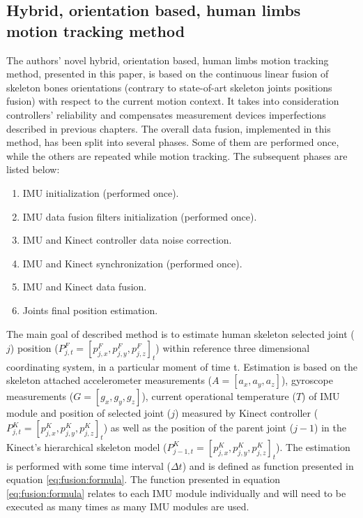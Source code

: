 \documentclass[sensors,article,submit,moreauthors,pdftex,10pt,a4paper]{mdpi}
\begin{document}
\subsection{Hybrid, orientation based, human limbs motion tracking method}
The authors’ novel hybrid, orientation based, human limbs motion tracking method, presented in this paper, is based on the continuous linear fusion of skeleton bones orientations (contrary to state-of-art skeleton joints positions fusion) with respect to the current motion context. It takes into consideration controllers’ reliability and compensates measurement devices imperfections described in previous chapters.
The overall data fusion, implemented in this method, has been split into several phases. Some of them are performed once, while the others are repeated while motion tracking. The subsequent phases are listed below:

\begin{enumerate}[leftmargin=*,labelsep=3mm]
	\item IMU initialization (performed once).
	\item IMU data fusion filters initialization (performed once).
	\item IMU and Kinect controller data noise correction.
	\item IMU and Kinect synchronization (performed once).
	\item IMU and Kinect data fusion.
	\item Joints final position estimation. 
\end{enumerate}

The main goal of described method is to estimate human skeleton selected joint ($j$) position ($P^F_{j,t} = [p^F_{j,x}, p^F_{j,y}, p^F_{j,z}]_t$) within reference three dimensional coordinating system, in a particular moment of time t. Estimation is based on the skeleton attached accelerometer measurements ($A=[a_x,a_y,a_z]$), gyroscope measurements ($G=[g_x,g_y,g_z]$), current operational temperature ($T$) of IMU module and position of selected joint ($j$) measured by Kinect controller ($P^K_{j,t} = [p^K_{j,x}, p^K_{j,y}, p^K_{j,z}]_t$) as well as the position of the parent joint ($j-1$) in the Kinect’s hierarchical skeleton model ($P^K_{j-1,t} = [p^K_{j,x}, p^K_{j,y}, p^K_{j,z}]_t$). The estimation is performed with some time interval ($\Delta t$) and is defined as function presented in equation \ref{eq:fusion:formula}. The function presented in equation \ref{eq:fusion:formula} relates to each IMU module individually and will need to be executed as many times as many IMU modules are used.
\end{document}
